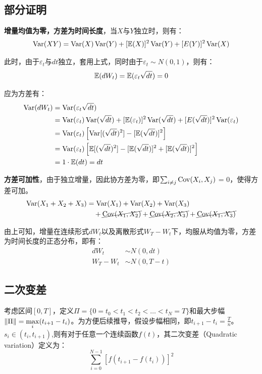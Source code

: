 \documentclass[11pt]{article}
\begin{document}
\subsection{部分证明}

\textbf{增量均值为零，方差为时间长度}，当$X$与$Y$独立时，则有：
\begin{equation*}
    \operatorname{Var}(XY) = \operatorname{Var}(X)\operatorname{Var}(Y) + [\mathbb{E}(X)]^2 \operatorname{Var}(Y) + [E(Y)]^2 \operatorname{Var}(X)
\end{equation*}

此时，由于$\varepsilon_t$与$dt$独立，套用上式，同时由于$\varepsilon_t \sim N(0,1)$，则有：
\begin{equation*}
    \mathbb{E}(dW_t) = \mathbb{E}(\varepsilon_t \sqrt{dt}) = 0
\end{equation*}

应为方差有：
\begin{align*}
    \operatorname{Var}(dW_t) & = \operatorname{Var}( \varepsilon_t \sqrt{dt}) \\
    & =  \operatorname{Var}(\varepsilon_t) \operatorname{Var}(\sqrt{dt}) + [\mathbb{E}(\varepsilon_t)]^2 \operatorname{Var}(\sqrt{dt}) + [E(\sqrt{dt})]^2 \operatorname{Var}(\varepsilon_t) \\
    & = \operatorname{Var}(\varepsilon_t) \left[ \operatorname{Var}[(\sqrt{dt})^2] - [\mathbb{E}(\sqrt{dt})]^2 \right] \\
    & = \operatorname{Var}(\varepsilon_t) \left[ \mathbb{E}[(\sqrt{dt})^2] - [\mathbb{E}(\sqrt{dt})]^2 + [\mathbb{E}(\sqrt{dt})]^2 \right] \\
    & = 1 \cdot \mathbb{E}(dt) = dt
\end{align*}

\textbf{方差可加性}，由于独立增量，因此协方差为零，即$\sum_{i\neq j} \operatorname{Cov}(X_i,X_j)$ = 0，使得方差可加。
\begin{align*}
    \operatorname{Var}(X_1+X_2+X_3)
    & = \operatorname{Var}(X_1) + \operatorname{Var}(X_2) + \operatorname{Var}(X_3) \\
    &\quad + \cancel{\operatorname{Cov}(X_1,X_2)} + \cancel{\operatorname{Cov}(X_2,X_3)} + \cancel{\operatorname{Cov}(X_1,X_3)}
\end{align*}

由上可知，增量在连续形式$dW_t$以及离散形式$W_T-W_t$下，均服从均值为零，方差为时间长度的正态分布，即有：
\begin{align*}
    dW_t & \sim N(0,dt) \\
    W_T - W_t & \sim N(0,T-t)
\end{align*}

\subsection{二次变差}

考虑区间$[0,T]$，定义$\Pi=\{0=t_0<t_1<t_2<\dots<t_N=T\}$和最大步幅$\left\lVert \Pi\right\rVert = \max\limits_{i}(t_{i+1}-t_{i})$。为方便后续推导，假设步幅相同，即$t_{i+1} - t_{i} = \tfrac{T}{n}$。$s_i \in (t_i,t_{i+1})$,则有对于任意一个连续函数$f(t)$，其二次变差（Quadratic variation）定义为：
\begin{equation*}
    \sum^{N-1}_{i=0} \left[ f(t_{i+1} - f(t_i)) \right]^2
\end{equation*}
\end{document}
